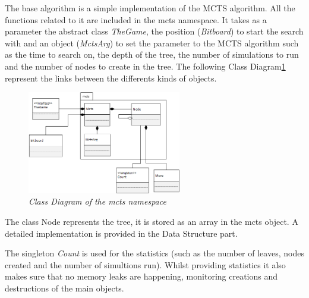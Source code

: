The base algorithm is a simple implementation of the MCTS algorithm. All the functions related to it are included in the mcts namespace. It takes as a parameter the abstract class \textit{TheGame}, the position (\textit{Bitboard}) to start the search with and an object (\textit{MctsArg}) to set the parameter to the MCTS algorithm such as the time to search on, the depth of the tree, the number of simulations to run and the number of nodes to create in the tree.
The following Class Diagram\ref{fig:MCTSClassDiagram} represent the links between the differents kinds of objects.
\begin{figure}[H] 
\centerline{\includegraphics[width=0.6\textwidth]{Base_Algorithm/Img/MCTSsimple.png}}
\caption{\label{fig:MCTSClassDiagram}\textit{Class Diagram of the mcts namespace}}
\end{figure}
The class Node represents the tree, it is stored as an array in the mcts object. A detailed implementation is provided in the Data Structure part.

The singleton \textit{Count} is used for the statistics (such as the number of leaves, nodes created and the number of simultions run). Whilst providing statistics it also makes sure that no  memory leaks are happening, monitoring creations and destructions of the main objects.

